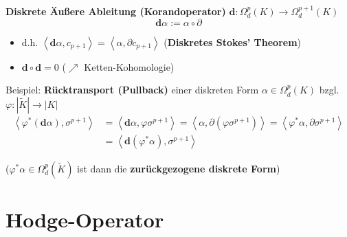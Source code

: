 \documentclass{beamer}
\renewcommand{\d}{\textbf{d}}
\begin{document}
  \begin{frame}
    \begin{block}{\textbf{Diskrete Äußere Ableitung (Korandoperator)} \( \d: \Omega_{d}^{p}(K) \longrightarrow \Omega_{d}^{p+1}(K) \)}
      \[ \d\alpha := \alpha\circ\partial \]
      \begin{itemize}
        \item d.h. \( \left\langle \d\alpha , c_{p+1} \right\rangle =  \left\langle \alpha , \partial c_{p+1} \right\rangle\) 
              \qquad(\textbf{Diskretes Stokes' Theorem})
        \pause
        \item \( \d\circ\d = 0 \) \qquad(\( \nearrow \) Ketten-Kohomologie)
      \end{itemize}
    \end{block}
    \pause
    \begin{block}{Beispiel: \textbf{Rücktransport (Pullback)} einer diskreten Form \( \alpha\in\Omega_{d}^{p}(K)\) bzgl. \( \varphi:|\tilde{K}|\rightarrow |K| \)}
      \begin{align*}
        \left\langle \varphi^{*}(\d \alpha) , \sigma^{p+1} \right\rangle &= \left\langle \d \alpha , \varphi\sigma^{p+1} \right\rangle
                                                                          = \left\langle \alpha , \partial(\varphi\sigma^{p+1}) \right\rangle
                                                                          =  \left\langle \varphi^{*}\alpha , \partial\sigma^{p+1} \right\rangle \\
                                                                         &= \left\langle \d(\varphi^{*}\alpha) , \sigma^{p+1} \right\rangle
      \end{align*}
    \end{block}
    (\( \varphi^{*}\alpha \in \Omega_{d}^{p}(\tilde{K}) \) ist dann die \textbf{zurückgezogene diskrete Form})
  \end{frame}




  \section{Hodge-Operator}
\end{document}
